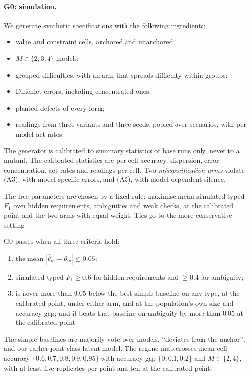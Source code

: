 \paragraph{G0: simulation.} We generate synthetic specifications with the following ingredients:
\begin{itemize}[leftmargin=*]
\item value and constraint cells, anchored and unanchored;
\item $M\in\{2,3,4\}$ models;
\item grouped difficulties, with an arm that spreads difficulty within groups;
\item Dirichlet errors, including concentrated ones;
\item planted defects of every form;
\item readings from three variants and three seeds, pooled over scenarios, with per-model act rates.
\end{itemize}
The generator is calibrated to summary statistics of base runs only, never to a mutant. The calibrated statistics are per-cell accuracy, dispersion, error concentration, act rates and readings per cell. Two \emph{misspecification arms} violate (A3), with model-specific errors, and (A5), with model-dependent silence.

The free parameters are chosen by a fixed rule: maximise mean simulated typed $F_1$ over hidden requirements, ambiguities and weak checks, at the calibrated point and the two arms with equal weight. Ties go to the more conservative setting.

G0 passes when all three criteria hold:
\begin{enumerate}[leftmargin=*,label=(\roman*)]
\item the mean $|\hat\theta_m-\theta_m|\le0.05$;
\item simulated typed $F_1\ge0.6$ for hidden requirements and $\ge0.4$ for ambiguity;
\item \specdx is never more than $0.05$ below the best simple baseline on any type, at the calibrated point, under either arm, and at the population's own size and accuracy gap; and it beats that baseline on ambiguity by more than $0.05$ at the calibrated point.
\end{enumerate}
The simple baselines are majority vote over models, ``deviates from the anchor'', and our earlier joint-class latent model. The regime map crosses mean cell accuracy $\{0.6,0.7,0.8,0.9,0.95\}$ with accuracy gap $\{0,0.1,0.2\}$ and $M\in\{2,4\}$, with at least five replicates per point and ten at the calibrated point.

